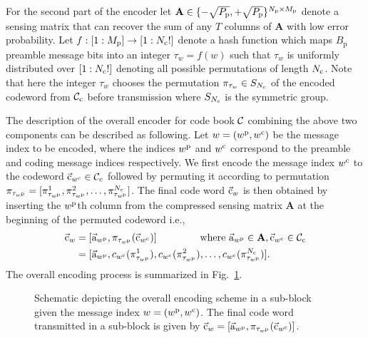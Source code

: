 For the second part of the encoder let $\mathbf{A}\in\{-\sqrt{P_{\mathrm{p}}},+\sqrt{P_{\mathrm{p}}}\}^{N_{\mathrm{p}}\times M_\mathrm{p}}$ denote a sensing matrix that can recover the sum of any $T$ columns of $\mathbf{A}$ with low error probability. Let $f:[1:M_\mathrm{p}] \rightarrow [1:N_{\mathrm{c}}!]$ denote a hash function which maps $B_\mathrm{p}$  preamble message bits into an integer $\tau_w = f(w)$ such that $\tau_w$ is uniformly distributed over $[1:N_{\mathrm{c}}!]$ denoting all possible permutations of length $N_{\mathrm{c}}$. Note that here the integer $\tau_w$ chooses the permutation $\pi_{\tau_w}\in S_{N_{\mathrm{c}}}$ of the encoded codeword from $\mathcal{C}_{\text{c}}$ before transmission where $S_{N_{\mathrm{c}}}$ is the symmetric group.

The description of the overall encoder for code book $\mathcal{C}$ combining the above two components can be described as following. Let $w= (w^\mathrm{p},w^\mathrm{c})$ be the message index to be encoded, where the indices $w^\mathrm{p}$ and $w^\mathrm{c}$ correspond to the preamble and coding message indices respectively. We first encode the message index $w^\mathrm{c}$ to the codeword $\vec{\mathrm{c}}_{w^\mathrm{c}}\in\mathcal{C}_{c}$ followed by permuting it according to permutation $\pi_{\tau_{w^\mathrm{p}}}=[\pi_{\tau_{w^\mathrm{p}}}^1,\pi_{\tau_{w^\mathrm{p}}}^2,\ldots, \pi_{\tau_{w^\mathrm{p}}}^{N_{\mathrm{c}}}]$. The final code word $\vec{\mathrm{c}}_{w}$ is then obtained by inserting the $w^\mathrm{p}$th column from the compressed sensing matrix $\mathbf{A}$ at the beginning of the permuted codeword i.e.,
\begin{align}
  \vec{\mathrm{c}}_w &= [\vec{\mathrm{a}}_{w^\mathrm{p}},\pi_{\tau_{w^\mathrm{p}}}(\vec{\mathrm{c}}_{w^\mathrm{c}})]  \qquad \qquad \text{ where }  \vec{\mathrm{a}}_{w^\mathrm{p}} \in \mathbf{A}, \vec{\mathrm{c}}_{w^\mathrm{c}}\in\mathcal{C}_{\text{c}} \notag \\
&= [\vec{\mathrm{a}}_{w^\mathrm{p}},c_{w^\mathrm{c}}(\pi_{\tau_{w^\mathrm{p}}}^1),c_{w^\mathrm{c}}(\pi_{\tau_{w^\mathrm{p}}}^2),\ldots,c_{w^\mathrm{c}}(\pi^{N_{\mathrm{c}}}_{\tau_{w^\mathrm{p}}})]\label{eqn:codeconstruction1}.
\end{align}
The overall encoding process is summarized in Fig.~\ref{fig:encodingscheme}.

\begin{figure}[h!]
  \centering
  \resizebox{0.7\textwidth}{!}{}
  \caption{Schematic depicting the overall encoding scheme in a sub-block given the message index $w=(w^\mathrm{p},w^\mathrm{c})$. The final code word transmitted in a sub-block is given by $\vec{\mathrm{c}}_w=[\vec{\mathrm{a}}_{w^\mathrm{p}},\pi_{\tau_{w^\mathrm{p}}}(\vec{\mathrm{c}}_{w^\mathrm{c}})]$.}
  \label{fig:encodingscheme}
\end{figure}

